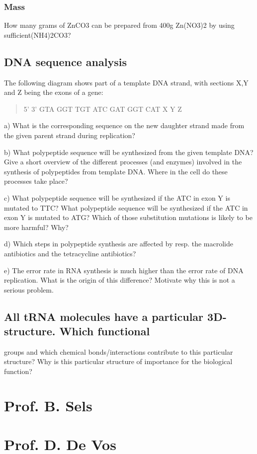 \documentclass[11pt, a4paper,titlepage]{article}
\begin{document}
\subsubsection{Mass}
\label{sec-1-1-5}

How many grams of ZnCO3 can be prepared from 400g Zn(NO3)2 by using
sufficient(NH4)2CO3?
\subsection{DNA sequence analysis}
\label{sec-1-2}


The following diagram shows part of a template DNA strand, with
sections X,Y and Z being the exons of a gene:

\begin{quote}
5’                        3’
GTA GGT TGT ATC GAT GGT CAT
 X         Y             Z
\end{quote}

a) What is the corresponding sequence on the new daughter strand made
from the given parent strand during replication? 

b) What polypeptide sequence will be synthesized from the given
template DNA? Give a short overview of the different processes (and
enzymes) involved in the synthesis of polypeptides from template
DNA. Where in the cell do these processes take place?

c) What polypeptide sequence will be synthesized if the ATC in exon Y
is mutated to TTC? What polypeptide sequence will be synthesized if
the ATC in exon Y is mutated to ATG? Which of those substitution
mutations is likely to be more harmful? Why?

d) Which steps in polypeptide synthesis are affected by resp. the
macrolide antibiotics and the tetracycline antibiotics?

e) The error rate in RNA synthesis is much higher than the error rate
of DNA replication. What is the origin of this difference? Motivate
why this is not a serious problem.
\subsection{All tRNA molecules have a particular 3D-structure. Which functional}
\label{sec-1-3}

   groups and which chemical bonds/interactions contribute to this
   particular structure? Why is this particular structure of
   importance for the biological function?
\section{Prof. B. Sels}
\label{sec-2}
\section{Prof. D. De Vos}
\label{sec-3}
\end{document}
